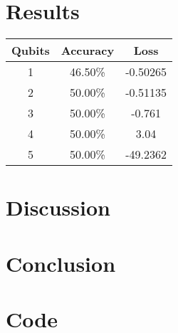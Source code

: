 \documentclass{article}
\begin{document}
\section{Results}
\begin{center}
\label{avgresults}
\begin{tabular}{ |c|c|c| }
\hline
Qubits & Accuracy & Loss\\
\hline
{1} & {46.50\%} & {-0.50265}\\ 
\hline
{2} & {50.00\%} & {-0.51135}\\
\hline
{3} & {50.00\%} & {-0.761}\\ 
\hline
{4} & {50.00\%} & {3.04}\\ 
\hline
{5} & {50.00\%} & {-49.2362}\\ 
\hline
\end{tabular}
\end{center}

\section{Discussion}

\section{Conclusion}

\newpage



\newpage

\appendix
\section{Code}
\inputminted{octave}{hnn.py}
\end{document}

